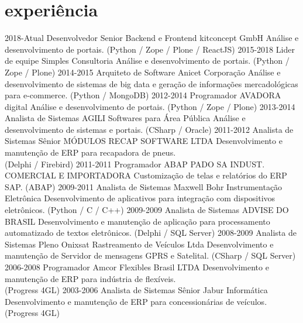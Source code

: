 \documentclass[]{src/twentysecondcv}
\begin{document}
\section{experiência}

\begin{twenty}
  \twentyitem
    {2018-Atual}
    {Desenvolvedor Senior Backend e Frontend}
    {kitconcept GmbH}
    {Análise e desenvolvimento de portais. (Python / Zope / Plone / ReactJS)}
  \twentyitem
    {2015-2018}
    {Lider de equipe}
    {Simples Consultoria}
    {Análise e desenvolvimento de portais. (Python / Zope / Plone)}
  \twentyitem
    {2014-2015}
    {Arquiteto de Software}
    {Anicet Corporação}
    {Análise e desenvolvimento de sistemas de big data e geração de informações mercadológicas para e-commerce. (Python / MongoDB)}
  \twentyitem
    {2012-2014}
    {Programador}
    {AVADORA digital}
    {Análise e desenvolvimento de portais. (Python / Zope / Plone)}
  \twentyitem
    {2013-2014}
    {Analista de Sistemas}
    {AGILI Softwares para Área Pública}
    {Análise e desenvolvimento de sistemas e portais. (CSharp / Oracle)}
  \twentyitem
    {2011-2012}
    {Analista de Sistemas Sênior}
    {MÓDULOS RECAP SOFTWARE LTDA}
    {Desenvolvimento e manutenção de ERP para recapadora de pneus.\\
    (Delphi / Firebird)}
  \twentyitem
    {2011-2011}
    {Programador ABAP}
    {PADO SA INDUST. COMERCIAL E IMPORTADORA}
    {Customização de telas e relatórios do ERP SAP. (ABAP)}
  \twentyitem
    {2009-2011}
    {Analista de Sistemas}
    {Maxwell Bohr Instrumentação Eletrônica}
    {Desenvolvimento de aplicativos para integração com dispositivos eletrônicos. (Python / C / C++)}
  \twentyitem
    {2009-2009}
    {Analista de Sistemas}
    {ADVISE DO BRASIL}
    {Desenvolvimento e manutenção de aplicação para processamento automatizado de textos eletrônicos. (Delphi / SQL Server)}
  \twentyitem
    {2008-2009}
    {Analista de Sistemas Pleno}
    {Onixsat Rastreamento de Veículos Ltda}
    {Desenvolvimento e manutenção de Servidor de mensagens GPRS e Satelital. (CSharp / SQL Server)}
  \twentyitem
    {2006-2008}
    {Programador}
    {Amcor Flexibles Brasil LTDA}
    {Desenvolvimento e manutenção de ERP para indústria de flexíveis.\\
    (Progress 4GL)}
  \twentyitem
    {2003-2006}
    {Analista de Sistemas Sênior}
    {Jabur Informática}
    {Desenvolvimento e manutenção de ERP para concessionárias de veículos.\\
    (Progress 4GL)}
\end{twenty}
\end{document}
